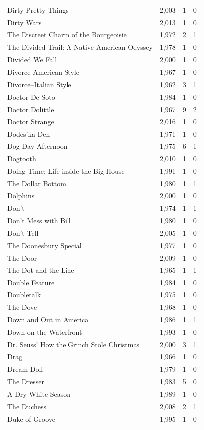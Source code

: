 \begin{tabular}{lrrr}
Dirty Pretty Things & 2,003 & 1 & 0 \\
Dirty Wars & 2,013 & 1 & 0 \\
The Discreet Charm of the Bourgeoisie & 1,972 & 2 & 1 \\
The Divided Trail: A Native American Odyssey & 1,978 & 1 & 0 \\
Divided We Fall & 2,000 & 1 & 0 \\
Divorce American Style & 1,967 & 1 & 0 \\
Divorce--Italian Style & 1,962 & 3 & 1 \\
Doctor De Soto & 1,984 & 1 & 0 \\
Doctor Dolittle & 1,967 & 9 & 2 \\
Doctor Strange & 2,016 & 1 & 0 \\
Dodes'ka-Den & 1,971 & 1 & 0 \\
Dog Day Afternoon & 1,975 & 6 & 1 \\
Dogtooth & 2,010 & 1 & 0 \\
Doing Time: Life inside the Big House & 1,991 & 1 & 0 \\
The Dollar Bottom & 1,980 & 1 & 1 \\
Dolphins & 2,000 & 1 & 0 \\
Don't & 1,974 & 1 & 1 \\
Don't Mess with Bill & 1,980 & 1 & 0 \\
Don't Tell & 2,005 & 1 & 0 \\
The Doonesbury Special & 1,977 & 1 & 0 \\
The Door & 2,009 & 1 & 0 \\
The Dot and the Line & 1,965 & 1 & 1 \\
Double Feature & 1,984 & 1 & 0 \\
Doubletalk & 1,975 & 1 & 0 \\
The Dove & 1,968 & 1 & 0 \\
Down and Out in America & 1,986 & 1 & 1 \\
Down on the Waterfront & 1,993 & 1 & 0 \\
Dr. Seuss' How the Grinch Stole Christmas & 2,000 & 3 & 1 \\
Drag & 1,966 & 1 & 0 \\
Dream Doll & 1,979 & 1 & 0 \\
The Dresser & 1,983 & 5 & 0 \\
A Dry White Season & 1,989 & 1 & 0 \\
The Duchess & 2,008 & 2 & 1 \\
Duke of Groove & 1,995 & 1 & 0 \\

\end{tabular}
